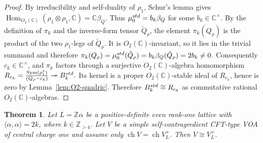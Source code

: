 \documentclass[10pt,a4paper]{amsart}
\numberwithin{equation}{section} \newtheorem{thm}{Theorem}[section] \newtheorem{lem}[thm]{Lemma} \newtheorem{ex}[thm]{Example} \newtheorem{prop}[thm]{Proposition} \newtheorem{cor}[thm]{Corollary} \newtheorem{defi}[thm]{Definition} \newtheorem{rmk}[thm]{Remark} \newtheorem{notation}[thm]{Notation}
\newcommand{\Sym}{\operatorname{Sym}}
\newcommand{\Hom}{\operatorname{Hom}}
\newcommand{\ch}{\operatorname{ch}}
\newcommand{\Otwo}{O_2(\C)}
\def\Z{\mathbb{Z}} \def\N{\mathbb{N}} \def\A{\mathbb{A}} \def\C{\mathbb{C}} \def\R{\mathbb{R}} \def\Q{\mathbb{Q}} \def\F{\mathbb{F}}
\begin{document}
\begin{proof}
By irreducibility and self-duality of $\rho_1$, Schur's lemma gives \(\Hom_{\Otwo}(\rho_1\otimes\rho_1,\C)=\C\beta_Q.\) Thus \(\mu_0^{\rm std}=b_k\beta_Q\) for some $b_k\in\C^\times$. By the definition of $\pi_k$ and the inverse-form tensor $\check Q_\rho$, the element $\pi_k(Q_\rho)$ is the product of the two $\rho_1$-legs of $\check Q_\rho$. It is $\Otwo$-invariant, so it lies in the trivial summand and therefore \(\pi_k(Q_\rho) =\mu_0^{\rm std}(\check Q_\rho) =b_k\beta_Q(\check Q_\rho) =2b_k\ne0.\) Consequently $c_k\in\C^\times$, and $\pi_k$ factors through a surjective $\Otwo$-algebra homomorphism \(R_{c_k}=\frac{\Sym(\rho_1^*)}{(Q_\rho-c_k)} \twoheadrightarrow B_k^{\rm std}.\) Its kernel is a proper $\Otwo$-stable ideal of $R_{c_k}$, hence is zero by Lemma~\ref{lem:O2-quadric}. Therefore $B_k^{\rm std}\cong R_{c_k}$ as commutative rational $\Otwo$-algebras.
\end{proof}

\begin{thm}\label{thm:VLplus-kgt4}
Let $L=\Z\alpha$ be a positive-definite even rank-one lattice with $\langle\alpha,\alpha\rangle=2k$, where $k\in\Z_{>4}$. Let $V$ be a simple self-contragredient CFT-type VOA of central charge one and assume only \(\ch V=\ch V_L^+.\) Then \(V\cong V_L^+.\)
\end{thm}
\end{document}
